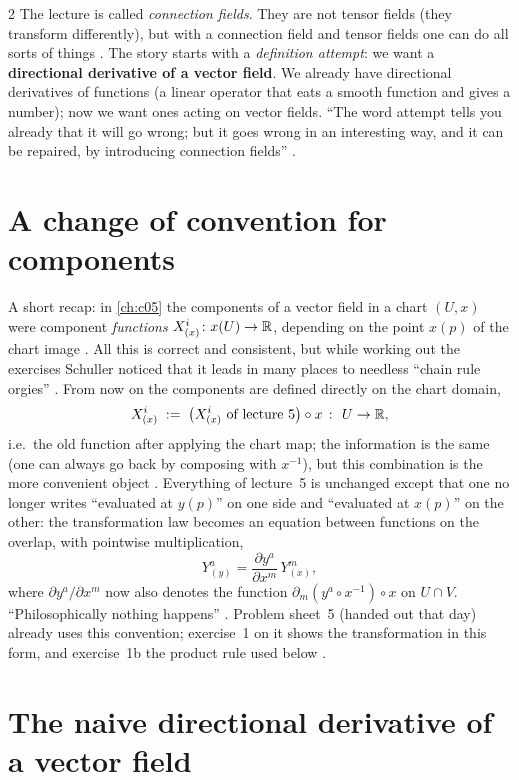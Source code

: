 \begin{paracol}{2}
The lecture is called \emph{connection fields}. They are not tensor fields (they transform differently), but with a
connection field and tensor fields one can do all sorts of things . The story starts with a
\emph{definition attempt}: we want a \textbf{directional derivative of a vector field}. We already have directional derivatives
of functions (a linear operator that eats a smooth function and gives a number); now we want ones acting on vector fields.
``The word attempt tells you already that it will go wrong; but it goes wrong in an interesting way, and it can be
repaired, by introducing connection fields'' .

\section{A change of convention for components}\label{sec:cf-convention}

A short recap: in \cref{ch:c05} the components of a vector field in a chart $(U,x)$ were component \emph{functions}
$X^i_{(x)}\colon x(U)\to\mathbb{R}$, depending on the point $x(p)$ of the chart image . All this is correct and
consistent, but while working out the exercises Schuller noticed that it leads in many places to needless ``chain rule
orgies'' . From now on the components are defined directly on the chart domain,
\[
  X^i_{(x)}\;:=\;\bigl(X^i_{(x)}\ \text{of lecture 5}\bigr)\circ x\ \colon\ U\to\mathbb{R} ,
\]
i.e.\ the old function after applying the chart map; the information is the same (one can always go back by composing with
$x^{-1}$), but this combination is the more convenient object . Everything of lecture~5 is unchanged except
that one no longer writes ``evaluated at $y(p)$'' on one side and ``evaluated at $x(p)$'' on the other: the transformation law
becomes an equation between functions on the overlap, with pointwise multiplication,
\[
  Y^a_{(y)}=\frac{\partial y^a}{\partial x^m}\,Y^m_{(x)} ,
\]
where $\partial y^a/\partial x^m$ now also denotes the function $\partial_m(y^a\circ x^{-1})\circ x$ on $U\cap V$.
``Philosophically nothing happens'' . Problem sheet~5 (handed out that day) already uses this convention;
exercise~1 on it shows the transformation in this form, and exercise~1b the product rule used below .

\section{The naive directional derivative of a vector field}\label{sec:cf-naive}


\end{paracol}
